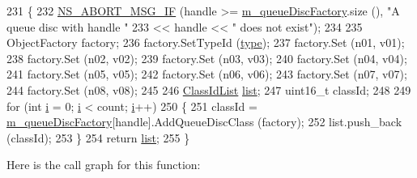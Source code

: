 \begin{DoxyCode}
231 \{
232   \hyperlink{group__fatal_ga6653324225bc139e46deea177614ceee}{NS\_ABORT\_MSG\_IF} (handle >= \hyperlink{classns3_1_1TrafficControlHelper_ae4ef4231b502104a4fd4245e53f9ae68}{m\_queueDiscFactory}.size (), \textcolor{stringliteral}{"A queue disc
       with handle "}
233                    << handle << \textcolor{stringliteral}{" does not exist"});
234 
235   ObjectFactory factory;
236   factory.SetTypeId (\hyperlink{visualizer-ideas_8txt_add98db9e15e2a58cf2b57623e7aa893a}{type});
237   factory.Set (n01, v01);
238   factory.Set (n02, v02);
239   factory.Set (n03, v03);
240   factory.Set (n04, v04);
241   factory.Set (n05, v05);
242   factory.Set (n06, v06);
243   factory.Set (n07, v07);
244   factory.Set (n08, v08);
245 
246   \hyperlink{classns3_1_1TrafficControlHelper_aa42018a8e7faa9b7d1d4d2320014ef56}{ClassIdList} \hyperlink{openflow-interface_8h_afd9bcfa176617760671b67580f536fa7}{list};
247   uint16\_t classId;
248 
249   \textcolor{keywordflow}{for} (\textcolor{keywordtype}{int} \hyperlink{bernuolliDistribution_8m_a6f6ccfcf58b31cb6412107d9d5281426}{i} = 0; \hyperlink{bernuolliDistribution_8m_a6f6ccfcf58b31cb6412107d9d5281426}{i} < count; \hyperlink{bernuolliDistribution_8m_a6f6ccfcf58b31cb6412107d9d5281426}{i}++)
250     \{
251       classId = \hyperlink{classns3_1_1TrafficControlHelper_ae4ef4231b502104a4fd4245e53f9ae68}{m\_queueDiscFactory}[handle].AddQueueDiscClass (factory);
252       list.push\_back (classId);
253     \}
254   \textcolor{keywordflow}{return} \hyperlink{openflow-interface_8h_afd9bcfa176617760671b67580f536fa7}{list};
255 \}
\end{DoxyCode}


Here is the call graph for this function\+:


